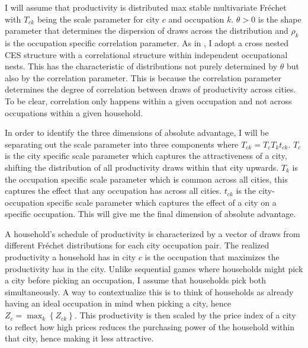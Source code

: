 \documentclass[10pt]{article}
\begin{document}
I will assume that productivity is distributed max stable multivariate Fr\'{e}chet with $T_{ck}$ being the scale parameter for city $c$ and occupation $k$. $\theta > 0$ is the shape parameter that determines the dispersion of draws across the distribution and $\rho_k$ is the occupation specific correlation parameter. As in \cite{lindandramondo}, I adopt a cross nested CES structure with a correlational structure within independent occupational nests. This has the characteristic of distributions not purely determined by $\theta$ but also by the correlation parameter. This is because the correlation parameter determines the degree of correlation between draws of productivity across cities. To be clear, correlation only happens within a given occupation and not across occupations within a given household.

In order to identify the three dimensions of absolute advantage, I will be separating out the scale parameter into three components where $T_{ck} = T_c T_k t_{ck}$. $T_c$ is the city specific scale parameter which captures the attractiveness of a city, shifting the distribution of all productivity draws within that city upwards. $T_k$ is the occupation specific scale parameter which is common across all cities, this captures the effect that any occupation has across all cities. $t_{ck}$ is the city-occupation specific scale parameter which captures the effect of a city on a specific occupation. This will give me the final dimension of absolute advantage.


A household's schedule of productivity is characterized by a vector of draws from different Fr\'{e}chet distributions for each city occupation pair. The realized productivity a household has in city $c$ is the occupation that maximizes the productivity has in the city. Unlike sequential games where households might pick a city before picking an occupation, I assume that households pick both simultaneously. A way to contextualize this is to think of households as already having an ideal occupation in mind when picking a city, hence $Z_c = \max_k \left\{ Z_{ck} \right\}$. This productivity is then scaled by the price index of a city to reflect how high prices reduces the purchasing power of the household within that city, hence making it less attractive.

\end{document}
